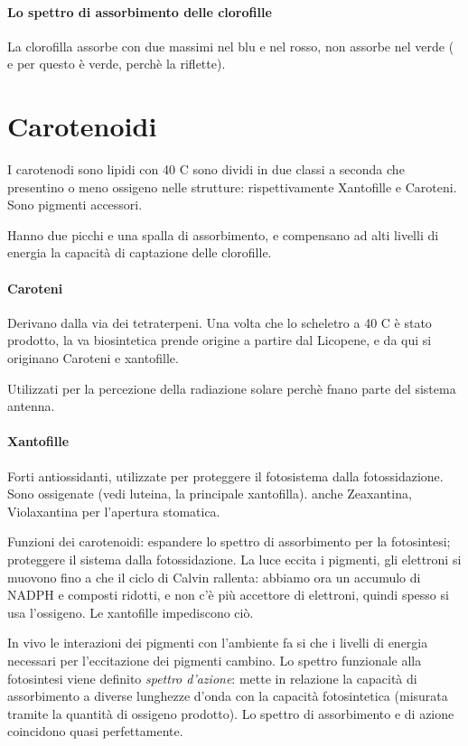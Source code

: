 \documentclass[a4paper,12pt]{book}
\begin{document}
\paragraph{Lo spettro di assorbimento delle clorofille}

La clorofilla assorbe con due massimi nel blu e nel rosso, non assorbe nel verde ( e per questo è verde, perchè la riflette).

\section{Carotenoidi}

I carotenodi sono lipidi con 40 C  sono dividi in due classi a seconda che presentino o meno ossigeno nelle strutture: rispettivamente Xantofille e Caroteni. Sono pigmenti accessori.

Hanno due picchi e una spalla di assorbimento, e compensano ad alti livelli di energia la capacità di captazione delle clorofille.

\paragraph{Caroteni}

Derivano dalla via dei tetraterpeni. Una volta che lo scheletro a 40 C è stato prodotto, la va biosintetica prende origine a partire dal Licopene, e da qui si originano Caroteni e xantofille.

Utilizzati per la percezione della radiazione solare perchè fnano parte del sistema antenna.

\paragraph{Xantofille}

Forti antiossidanti, utilizzate per proteggere il fotosistema dalla fotossidazione. Sono ossigenate (vedi luteina, la principale xantofilla). anche Zeaxantina, Violaxantina per l’apertura stomatica.

Funzioni dei carotenoidi: espandere lo spettro di assorbimento per la fotosintesi; proteggere il sistema dalla fotossidazione. La luce eccita i pigmenti, gli elettroni si muovono fino a che il ciclo di Calvin rallenta: abbiamo ora un accumulo di NADPH e composti ridotti, e non c’è più accettore di elettroni, quindi spesso si usa l’ossigeno. Le xantofille impediscono ciò.

In vivo le interazioni dei pigmenti con l’ambiente fa si che i livelli di energia necessari per l’eccitazione dei pigmenti cambino.  Lo spettro funzionale alla fotosintesi viene definito \emph{spettro d’azione}: mette in relazione la capacità di assorbimento a diverse lunghezze d’onda con la capacità fotosintetica (misurata tramite la quantità di ossigeno prodotto).  Lo spettro di assorbimento e di azione coincidono quasi perfettamente.
\end{document}

